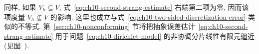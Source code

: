 同样, 如果 $V_h\subseteq V$, 式~\eqref{eq:ch10-second-strang-estimate} 右端第二项为零, 因而该项度量 $V_h\not\subseteq V$ 的影响. 这里也成立与式~\eqref{eq:ch10-two-sided-discretization-error} 类似的不等式. 第~\ref{sec:ch10-nonconforming} 节将把抽象误差估计~\eqref{eq:ch10-second-strang-estimate} 用于问题~\eqref{eq:ch10-dirichlet-model} 的非协调分片线性有限元逼近(见图~).
